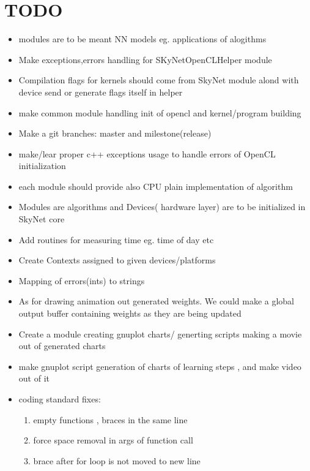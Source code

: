 \documentclass[a4paper,10pt]{article}
\begin{document}
\section{TODO}
\begin{itemize}
\item modules are to be meant NN models eg. applications of alogithms
\item Make exceptions,errors handling for SKyNetOpenCLHelper module
\item Compilation flags for kernels should come from SkyNet module alond with device send or generate flags itself in helper
\item make common module handling init of opencl and kernel/program building
\item Make a git branches: master and milestone(release)
\item make/lear proper c++ exceptions usage to handle errors of OpenCL initialization
\item each module should provide also CPU plain implementation of algorithm
\item Modules are algorithms and Devices( hardware layer) are to be initialized in SkyNet core
\item Add routines for measuring time eg. time of day etc
\item Create Contexts assigned to given devices/platforms
\item Mapping of errors(ints) to strings
\item As for drawing animation out generated weights. We could make a global output buffer
containing weights as they are being updated
\item Create a module creating gnuplot charts/ generting scripts making a movie out of generated charts
\item make gnuplot script generation of charts of learning steps , and make video out of it
\item coding standard fixes:
\begin{enumerate}
\item empty functions , braces in the same line
\item force space removal in args of function call
\item brace after for loop is not moved to new line
\end{enumerate}
\end{itemize}
\end{document}

